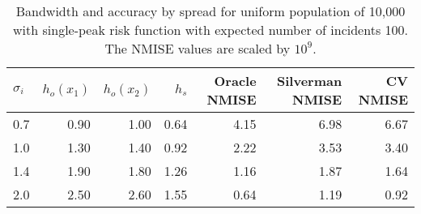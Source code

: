 \begin{table}[ht]
\centering
\begin{tabular}{lrrrrrr}
  \hline
$\sigma_i$ & $h_{o}(x_1)$ & $h_{o}(x_2)$ & $h_{s}$ & Oracle NMISE & Silverman NMISE & CV NMISE \\ 
  \hline
0.7 & 0.90 & 1.00 & 0.64 & 4.15 & 6.98 & 6.67 \\ 
  1.0 & 1.30 & 1.40 & 0.92 & 2.22 & 3.53 & 3.40 \\ 
  1.4 & 1.90 & 1.80 & 1.26 & 1.16 & 1.87 & 1.64 \\ 
  2.0 & 2.50 & 2.60 & 1.55 & 0.64 & 1.19 & 0.92 \\ 
   \hline
\end{tabular}
\caption[Bandwidth and accuracy by spread of incidents]{Bandwidth and accuracy by spread for uniform population of 10,000 with single-peak risk function with expected number of incidents 100. The NMISE values are scaled by $10^9$.} 
\label{tab:results:bandwidth_vs_spread}
\end{table}
